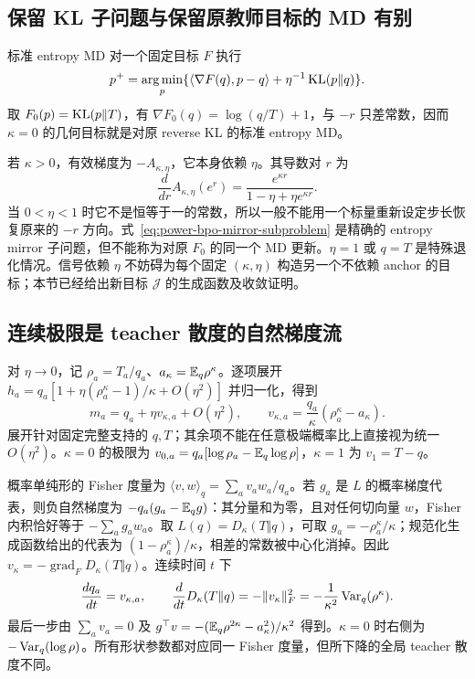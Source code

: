 \subsection{保留 KL 子问题与保留原教师目标的 MD 有别}

标准 entropy MD 对一个固定目标 $F$ 执行
\begin{equation}
 p^+=\operatorname*{arg\,min}_p\{\langle\nabla F(q),p-q\rangle+\eta^{-1}\operatorname{KL}(p\Vert q)\}.
\end{equation}
取 $F_0(p)=\operatorname{KL}(p\Vert T)$，有 $\nabla F_0(q)=\log(q/T)+1$，与 $-r$ 只差常数，因而 $\kappa=0$ 的几何目标就是对原 reverse KL 的标准 entropy MD。

若 $\kappa>0$，有效梯度为 $-A_{\kappa,\eta}$，它本身依赖 $\eta$。其导数对 $r$ 为
\begin{equation}
 \frac{d}{dr}A_{\kappa,\eta}(e^r)=\frac{e^{\kappa r}}{1-\eta+\eta e^{\kappa r}}.
\end{equation}
当 $0<\eta<1$ 时它不是恒等于一的常数，所以一般不能用一个标量重新设定步长恢复原来的 $-r$ 方向。式~\eqref{eq:power-bpo-mirror-subproblem} 是精确的 entropy mirror 子问题，但不能称为对原 $F_0$ 的同一个 MD 更新。$\eta=1$ 或 $q=T$ 是特殊退化情况。信号依赖 $\eta$ 不妨碍为每个固定 $(\kappa,\eta)$ 构造另一个不依赖 anchor 的目标；本节已经给出新目标 $\mathcal J$ 的生成函数及收敛证明。

\subsection{连续极限是 teacher 散度的自然梯度流}

对 $\eta\to0$，记 $\rho_a=T_a/q_a$、$a_\kappa=\mathbb E_q\rho^\kappa$。逐项展开 $h_a=q_a[1+\eta(\rho_a^\kappa-1)/\kappa+O(\eta^2)]$ 并归一化，得到
\begin{equation}
 m_a=q_a+\eta v_{\kappa,a}+O(\eta^2),\qquad
 v_{\kappa,a}=\frac{q_a}{\kappa}(\rho_a^\kappa-a_\kappa).
 \label{eq:proximal-natural-velocity}
\end{equation}
展开针对固定完整支持的 $q,T$；其余项不能在任意极端概率比上直接视为统一 $O(\eta^2)$。$\kappa=0$ 的极限为 $v_{0,a}=q_a[\log\rho_a-\mathbb E_q\log\rho]$，$\kappa=1$ 为 $v_1=T-q$。

概率单纯形的 Fisher 度量为 $\langle v,w\rangle_q=\sum_av_aw_a/q_a$。若 $g_a$ 是 $L$ 的概率梯度代表，则负自然梯度为 $-q_a(g_a-\mathbb E_qg)$：其分量和为零，且对任何切向量 $w$，Fisher 内积恰好等于 $-\sum_ag_aw_a$。取 $L(q)=D_\kappa(T\Vert q)$，可取 $g_a=-\rho_a^\kappa/\kappa$；规范化生成函数给出的代表为 $(1-\rho_a^\kappa)/\kappa$，相差的常数被中心化消掉。因此 $v_\kappa=-\operatorname{grad}_{\!F}D_\kappa(T\Vert q)$。连续时间 $t$ 下
\begin{equation}
 \frac{dq_a}{dt}=v_{\kappa,a},\qquad
 \frac{d}{dt}D_\kappa(T\Vert q)
 =-\|v_\kappa\|_F^2
 =-\frac1{\kappa^2}\operatorname{Var}_q(\rho^\kappa).
 \label{eq:proximal-flow-lyapunov}
\end{equation}
最后一步由 $\sum_av_a=0$ 及 $g^\top v=-(\mathbb E_q\rho^{2\kappa}-a_\kappa^2)/\kappa^2$ 得到。$\kappa=0$ 时右侧为 $-\operatorname{Var}_q(\log\rho)$。所有形状参数都对应同一 Fisher 度量，但所下降的全局 teacher 散度不同。
